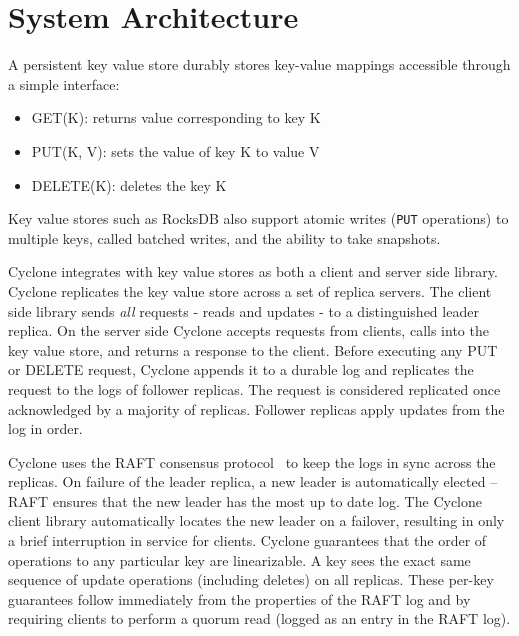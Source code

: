 \documentclass[twocolumn]{article}
\begin{document}
\section{System Architecture}
\label{sec:sysarch}
A persistent key value store durably stores key-value mappings accessible
through a simple interface:

\begin{itemize}
\item GET(K): returns value corresponding to key K
\item PUT(K, V): sets the value of key K to value V
\item DELETE(K): deletes the key K
\end{itemize}

Key value stores such as RocksDB also support atomic writes ({\tt PUT}
operations) to multiple keys, called batched writes, and the ability to take
snapshots.

Cyclone integrates with key value stores as both a client and server side
library. Cyclone replicates the key value store across a set of replica
servers. The client side library sends \emph{all} requests - reads and updates -
to a distinguished leader replica.  On the server side Cyclone accepts requests
from clients, calls into the key value store, and returns a response to the
client. Before executing any PUT or DELETE request, Cyclone appends it to a
durable log and replicates the request to the logs of follower replicas. The
request is considered replicated once acknowledged by a majority of
replicas. Follower replicas apply updates from the log in order.

Cyclone uses the RAFT consensus protocol~\cite{raft} to keep the logs in sync
across the replicas. On failure of the leader replica, a new leader is
automatically elected -- RAFT ensures that the new leader has the most up to
date log. The Cyclone client library automatically locates the new leader on a
failover, resulting in only a brief interruption in service for
clients.  Cyclone guarantees that the order of operations to any particular key 
are linearizable. A key sees the exact same sequence of update operations 
(including deletes) on all replicas. These per-key guarantees follow immediately 
from the properties of the RAFT log and by requiring clients to perform a quorum 
read (logged as an entry in the RAFT log).
\end{document}
